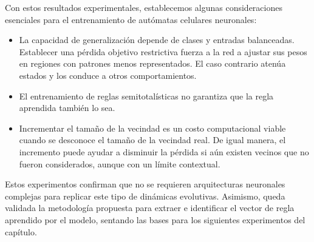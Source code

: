 Con estos resultados experimentales, establecemos algunas consideraciones esenciales para el entrenamiento de autómatas celulares neuronales:

\begin{itemize}
	\item La capacidad de generalización depende de clases y entradas balanceadas. Establecer una pérdida objetivo restrictiva fuerza a la red a ajustar sus pesos en regiones con patrones menos representados. El caso contrario atenúa estados y los conduce a otros comportamientos. 
	
	\item El entrenamiento de reglas semitotalísticas no garantiza que la regla aprendida también lo sea. 

	\item Incrementar el tamaño de la vecindad es un costo computacional viable cuando se desconoce el tamaño de la vecindad real. De igual manera, el incremento puede ayudar a disminuir la pérdida si aún existen vecinos que no fueron considerados, aunque con un límite contextual.

\end{itemize}

Estos experimentos confirman que no se requieren arquitecturas neuronales complejas para replicar este tipo de dinámicas evolutivas. Asimismo, queda validada la metodología propuesta para extraer e identificar el vector de regla aprendido por el modelo, sentando las bases para los siguientes experimentos del capítulo.
